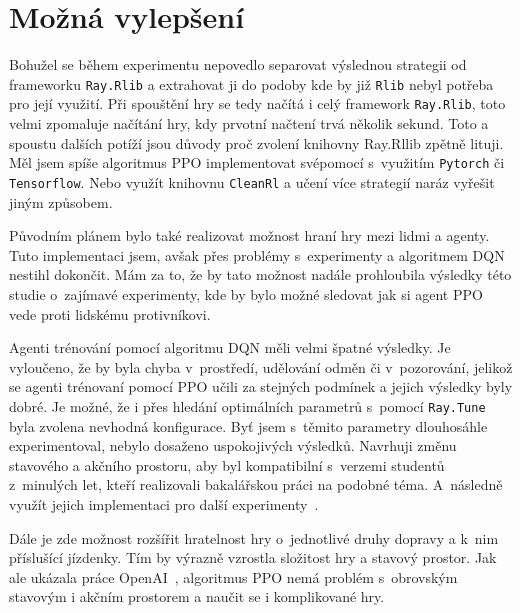\section*{Možná vylepšení}
\label{sec:mozna-vylepseni}

Bohužel se během experimentu nepovedlo separovat výslednou strategii od frameworku \texttt{Ray.Rlib} a extrahovat ji do podoby kde by již \texttt{Rlib} nebyl potřeba pro její využití.
Při spouštění hry se tedy načítá i celý framework \texttt{Ray.Rlib}, toto velmi zpomaluje načítání hry, kdy prvotní načtení trvá několik sekund.
Toto a spoustu dalších potíží jsou důvody proč zvolení knihovny Ray.Rllib zpětně lituji.
Měl jsem spíše algoritmus PPO implementovat svépomocí s~využitím \texttt{Pytorch} či \texttt{Tensorflow}.
Nebo využít knihovnu \texttt{CleanRl} a učení více strategií naráz vyřešit jiným způsobem.

\medskip
Původním plánem bylo také realizovat možnost hraní hry mezi lidmi a agenty.
Tuto implementaci jsem, avšak přes problémy s~experimenty a algoritmem DQN nestihl dokončit.
Mám za to, že by tato možnost nadále prohloubila výsledky této studie o~zajímavé experimenty, kde by bylo možné sledovat jak si agent PPO vede proti lidskému protivníkovi.

\medskip
Agenti trénování pomocí algoritmu DQN měli velmi špatné výsledky.
Je vyloučeno, že by byla chyba v~prostředí, udělování odměn či v~pozorování, jelikož se agenti trénovaní pomocí PPO učili za stejných podmínek a jejich výsledky byly dobré.
Je možné, že i přes hledání optimálních parametrů s~pomocí \texttt{Ray.Tune} byla zvolena nevhodná konfigurace.
Byť jsem s~těmito parametry dlouhosáhle experimentoval, nebylo dosaženo uspokojivých výsledků.
Navrhuji změnu stavového a akčního prostoru, aby byl kompatibilní s~verzemi studentů z~minulých let, kteří realizovali bakalářskou práci na podobné téma.
A~následně využít jejich implementaci pro další experimenty~\cite{Hrklova2023thesis}.

\medskip
Dále je zde možnost rozšířit hratelnost hry o~jednotlivé druhy dopravy a k~nim příslušící jízdenky.
Tím by výrazně vzrostla složitost hry a stavový prostor.
Jak ale ukázala práce OpenAI~\cite{Dota2}, algoritmus PPO nemá problém s~obrovským stavovým i akčním prostorem a naučit se i komplikované hry.




%
